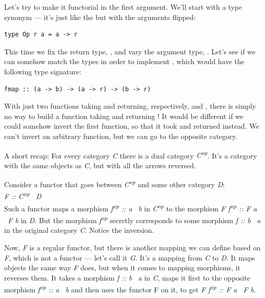 Let's try to make it functorial in the first argument. We'll start with
a type synonym --- it's just like the  but with the
arguments flipped:

\begin{Verbatim}[commandchars=\\\{\}]
type Op r a = a -> r
\end{Verbatim}
This time we fix the return type, , and vary the argument
type, . Let's see if we can somehow match the types in order
to implement , which would have the following type
signature:

\begin{Verbatim}[commandchars=\\\{\}]
fmap :: (a -> b) -> (a -> r) -> (b -> r)
\end{Verbatim}
With just two functions taking  and returning, respectively,
 and , there is simply no way to build a function
taking  and returning ! It would be different if we
could somehow invert the first function, so that it took  and
returned  instead. We can't invert an arbitrary function, but
we can go to the opposite category.

A short recap: For every category \emph{C} there is a dual category
\emph{C\textsuperscript{op}}. It's a category with the same objects as
\emph{C}, but with all the arrows reversed.

Consider a functor that goes between \emph{C\textsuperscript{op}} and
some other category \emph{D}:\\
\emph{F :: C\textsuperscript{op} \to\ D}\\
Such a functor maps a morphism \emph{f\textsuperscript{op} :: a \to\ b} in
\emph{C\textsuperscript{op}} to the morphism \emph{F
f\textsuperscript{op} :: F a \to\ F b} in \emph{D}. But the morphism
\emph{f\textsuperscript{op}} secretly corresponds to some morphism
\emph{f :: b \to\ a} in the original category \emph{C}. Notice the
inversion.

Now, \emph{F} is a regular functor, but there is another mapping we can
define based on \emph{F}, which is not a functor --- let's call it
\emph{G}. It's a mapping from \emph{C} to \emph{D}. It maps objects the
same way \emph{F} does, but when it comes to mapping morphisms, it
reverses them. It takes a morphism \emph{f :: b \to\ a} in \emph{C}, maps
it first to the opposite morphism \emph{f\textsuperscript{op} :: a \to\ b}
and then uses the functor F on it, to get \emph{F f\textsuperscript{op}
:: F a \to\ F b}.

